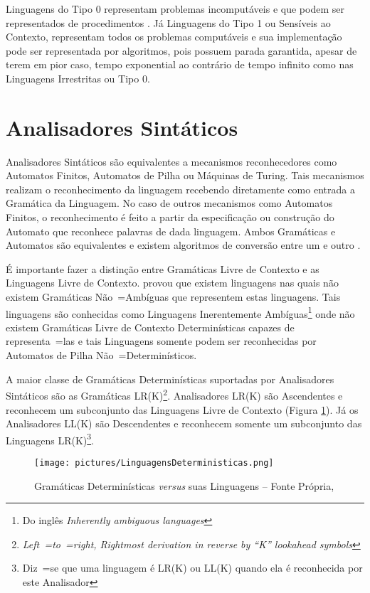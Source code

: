{    Linguagens do Tipo 0 representam problemas incomputáveis e
    que podem ser representados de procedimentos \cite{sipserBook}.
    Já Linguagens do Tipo 1 ou
    Sensíveis ao Contexto,
    representam todos os problemas computáveis e
    sua implementação pode ser representada por algoritmos,
    pois possuem parada garantida,
    apesar de terem em pior caso,
    tempo exponential ao contrário de tempo infinito como nas Linguagens Irrestritas ou
    Tipo 0.


\section{Analisadores Sintáticos}
\label{analisadoresSintaticos}

    Analisadores Sintáticos são equivalentes a mecanismos reconhecedores como Automatos Finitos,
    Automatos de Pilha ou
    Máquinas de Turing.
    Tais mecanismos realizam o reconhecimento da linguagem recebendo diretamente como entrada a Gramática da Linguagem.
    No caso de outros mecanismos como Automatos Finitos,
    o reconhecimento é feito a partir da especificação ou
    construção do Automato que reconhece palavras de dada linguagem.
    Ambos Gramáticas e
    Automatos são equivalentes e
    existem algoritmos de conversão entre um e
    outro \cite{hopcroftBook}.

    É importante fazer a distinção entre Gramáticas Livre de Contexto e
    as Linguagens Livre de Contexto.
     provou que existem linguagens nas quais não existem Gramáticas Não~=Ambíguas que representem estas linguagens.
    Tais linguagens são conhecidas como Linguagens Inerentemente Ambíguas\footnote{Do inglês \textit{Inherently ambiguous languages}} onde não existem Gramáticas Livre de Contexto Determinísticas capazes de representa~=las e
    tais Linguagens somente podem ser reconhecidas por Automatos de Pilha Não~=Determinísticos.

    A maior classe de Gramáticas Determinísticas suportadas por Analisadores
    Sintáticos são as Gramáticas LR(K)\footnote{\textit{Left~=to~=right,
    Rightmost derivation in reverse by ``K'' lookahead symbols
    }}.
    Analisadores LR(K) \cite{ahoCompilerDragonBook} são Ascendentes e
    reconhecem um subconjunto das Linguagens Livre de Contexto (Figura \ref{fig:pictures/LinguagensDeterministicas.png}).
    Já os Analisadores LL(K) são Descendentes \cite{antlrBookTerrentParr} e
    reconhecem somente um subconjunto das Linguagens LR(K)\footnote{Diz~=se que uma linguagem é LR(K) ou
    LL(K) quando ela é reconhecida por este Analisador}.
    \begin{figure}[H]
    \centering
    \texttt{[image: pictures/LinguagensDeterministicas.png]}
    \caption{Gramáticas Determinísticas \textit{versus} suas Linguagens -- Fonte Própria,
    }
    \label{fig:pictures/LinguagensDeterministicas.png}
    \end{figure}

}
